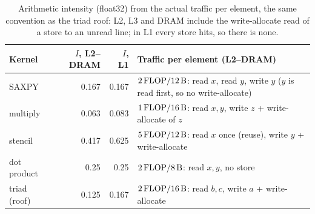 \begin{table}[tbp]
  \centering\small
  \caption{Arithmetic intensity (float32) from the actual traffic per element, the same convention
  as the triad roof: L2, L3 and DRAM include the write-allocate read of a store to an unread line;
  in L1 every store hits, so there is none.}\label{tab:roofline-inputs}
  \begin{tabularx}{\linewidth}{@{}lrrX@{}}
    \toprule
    Kernel & $I$, L2--DRAM & $I$, L1 & Traffic per element (L2--DRAM) \\
    \midrule
    SAXPY        & \num{0.167} & \num{0.167} & $2\,\text{FLOP} / \qty{12}{\byte}$: read $x$, read $y$, write $y$
                                  ($y$ is read first, so no write-allocate) \\
    multiply     & \num{0.063} & \num{0.083} & $1\,\text{FLOP} / \qty{16}{\byte}$: read $x,y$, write $z$ + write-allocate of $z$ \\
    stencil      & \num{0.417} & \num{0.625} & $5\,\text{FLOP} / \qty{12}{\byte}$: read $x$ once (reuse), write $y$ + write-allocate \\
    dot product  & \num{0.25}  & \num{0.25}  & $2\,\text{FLOP} / \qty{8}{\byte}$: read $x,y$, no store \\
    triad (roof) & \num{0.125} & \num{0.167} & $2\,\text{FLOP} / \qty{16}{\byte}$: read $b,c$, write $a$ + write-allocate \\
    \bottomrule
  \end{tabularx}
\end{table}

